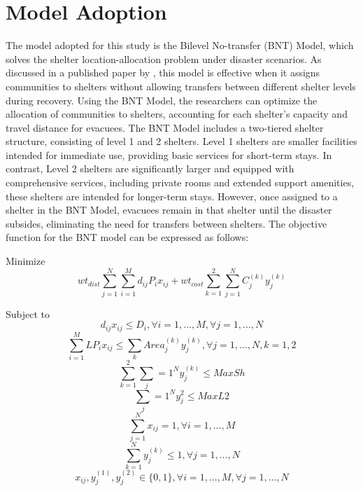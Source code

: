 \section{Model Adoption}
	The model adopted for this study is the Bilevel No-transfer (BNT) Model, which solves the shelter location-allocation problem under disaster scenarios. As discussed in a published paper by \textcite{LeahUP}, this model is effective when it assigns communities to shelters without allowing transfers between different shelter levels during recovery. Using the BNT Model, the researchers can optimize the allocation of communities to shelters, accounting for each shelter’s capacity and travel distance for evacuees.
	The BNT Model includes a two-tiered shelter structure, consisting of level 1 and 2 shelters. Level 1 shelters are smaller facilities intended for immediate use, providing basic services for short-term stays. In contrast, Level 2 shelters are significantly larger and equipped with comprehensive services, including private rooms and extended support amenities, these shelters are intended for longer-term stays. However, once assigned to a shelter in the BNT Model, evacuees remain in that shelter until the disaster subsides, eliminating the need for transfers between shelters.
	The objective function for the BNT model can be expressed as follows:
	
	Minimize 
	\begin{equation}
		wt_{dist}\sum_{j=1}^{N}\sum_{i=1}^{M}d_{ij}P_{i}x_{ij}+wt_{cost}\sum_{k=1}^{2}\sum_{j=1}^{N}C_{j}^{(k)}y_{j}^{(k)} 
	\end{equation}
	
	Subject to
	\begin{equation} 	
		\label{c1}
		d_{ij}x_{ij} \le D_{i}, \forall i = 1,..., M,  \forall j = 1,..., N 
	\end{equation}
	\begin{equation} 
		\label{c2}
		\sum_{i=1}^{M}LP_{i}x_{ij} \le \sum_{k} Area_{j}^{(k)} y_{j}^{(k)}, \forall j = 1,..., N , k=1,2
	\end{equation}
	\begin{equation} 
		\label{c3}
		\sum_{k=1}^{2} \sum_j={1}^{N}y_{j}^{(k)} \le MaxSh
	\end{equation}
	\begin{equation}
		\label{c4} 
		\sum_j={1}^{N}y_{j}^2 \le MaxL2
	\end{equation}
	\begin{equation}
		\label{c5}
		\sum_{j=1}^{N}x_{ij} = 1, \forall i=1,...,M
	\end{equation}
	\begin{equation}
		\label{c6}
		\sum_{k=1}^{N}y_{j}^{(k)} \le 1, \forall j=1,...,N
	\end{equation}
	\begin{equation}
		\label{c7}
	 	x_{ij}, y_{j}^{(1)},y_{j}^{(2)} \in \{0,1\}, \forall i=1,...,M,  \forall j=1,...,N
	\end{equation}
	
